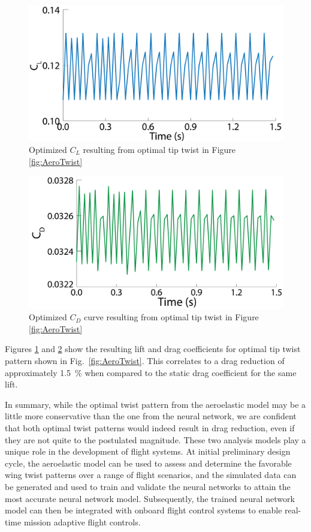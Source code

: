 \documentclass[11pt]{ucthesis}
\begin{document}
\begin{figure}[thpb]
\centering
\includegraphics[width=1\linewidth]{./Figures/AeroCLOpt-01.png}
\caption{Optimized $C_L$ resulting from optimal tip twist in Figure \ref{fig:AeroTwist}}
\label{fig:AeroCL}
\end{figure}

\begin{figure}[thpb]
\centering
\includegraphics[width=1\linewidth]{./Figures/OptimalAeroCD-01.png}
\caption{Optimized $C_D$ curve resulting from optimal tip twist in Figure \ref{fig:AeroTwist}}
\label{fig:AeroCD}
\end{figure}

Figures \ref{fig:AeroCL} and \ref{fig:AeroCD} show the resulting lift and drag coefficients for optimal tip twist pattern shown in Fig.~\ref{fig:AeroTwist}. This correlates to a drag reduction of approximately 1.5~\% when compared to the static drag coefficient for the same lift.

In summary, while the optimal twist pattern from the aeroelastic model may be a little more conservative than the one from the neural network, we are confident that both optimal twist patterns would indeed result in drag reduction, even if they are not quite to the postulated magnitude. These two analysis models play a unique role in the development of flight systems. At initial preliminary design cycle, the aeroelastic model can be used to assess and determine the favorable wing twist patterns over a range of flight scenarios, and the simulated data can be generated and used to train and validate the neural networks to attain the most accurate neural network model. Subsequently, the trained neural network model can then be integrated with onboard flight control systems to enable real-time mission adaptive flight controls.  
\end{document}

